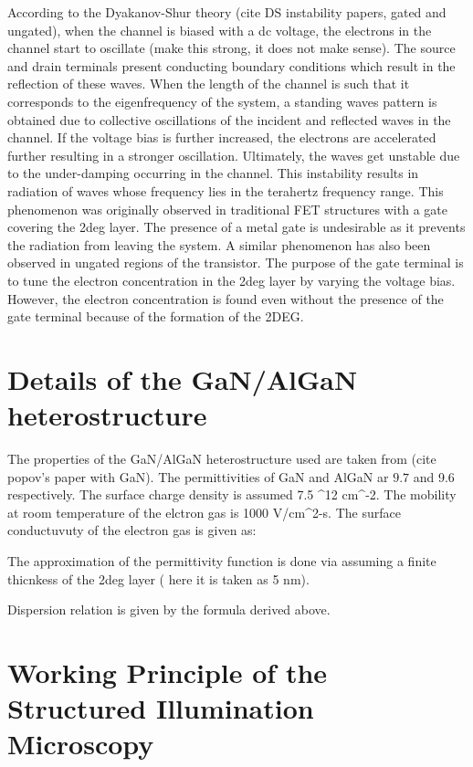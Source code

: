 \documentclass[11pt]{article}
\begin{document}
According to the Dyakanov-Shur theory (cite DS instability papers, gated and ungated), when the channel is biased with a dc voltage, the electrons in the channel start to oscillate (make this strong, it does not make sense). The source and drain terminals present conducting boundary conditions which result in the reflection of these waves. When the length of the channel is such that it corresponds to the eigenfrequency of the system, a standing waves pattern is obtained due to collective oscillations of the incident and reflected waves in the channel. If the voltage bias is further increased, the electrons are accelerated further resulting in a stronger oscillation. Ultimately, the waves get unstable due to the under-damping occurring in the channel. This instability results in radiation of waves whose frequency lies in the terahertz frequency range. This phenomenon was originally observed in traditional FET structures with a gate covering the 2deg layer. The presence of a metal gate is undesirable as it prevents the radiation from leaving the system. A similar phenomenon has also been observed in ungated regions of the transistor. The purpose of the gate terminal is to tune the electron concentration in the 2deg layer by varying the voltage bias. However, the electron concentration is found even without the presence of the gate terminal because of the formation of the 2DEG.

\section{Details of the GaN/AlGaN heterostructure}

The properties of the GaN/AlGaN heterostructure used are taken from (cite popov's paper with GaN). The permittivities of GaN and AlGaN ar $9.7$ and 9.6 respectively. The surface charge density is assumed 7.5 ^12 cm^-2. The mobility at room temperature of the elctron gas is 1000 V/cm^2-s. The surface conductuvuty of the electron gas is given as:


The approximation of the permittivity function is done via assuming a finite thicnkess of the 2deg layer ( here it is taken as 5 nm).

Dispersion relation is given by the formula derived above.

\section{Working Principle of the Structured Illumination Microscopy}
\end{document}
